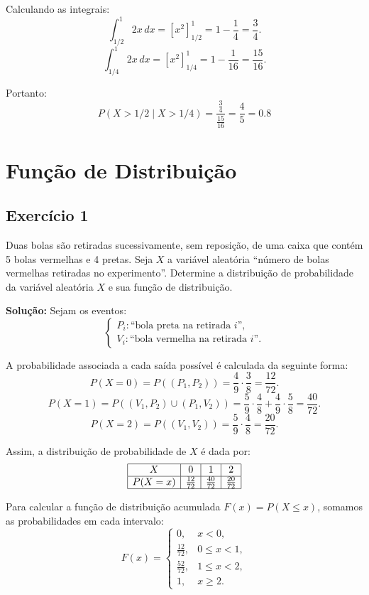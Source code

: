 \documentclass{article}
\begin{document}
Calculando as integrais:
    $$
    \int_{1/2}^{1} 2x \, dx = \left[ x^2 \right]_{1/2}^{1} = 1 - \frac{1}{4} = \frac{3}{4}.
    $$
    $$
    \int_{1/4}^{1} 2x \, dx = \left[ x^2 \right]_{1/4}^{1} = 1 - \frac{1}{16} = \frac{15}{16}.
    $$

Portanto:
    $$
    P(X > 1/2 \mid X > 1/4) = \frac{\tfrac{3}{4}}{\tfrac{15}{16}} = \frac{4}{5} = 0.8
    $$

\section{Função de Distribuição}
\subsection{Exercício 1}
Duas bolas são retiradas sucessivamente, sem reposição, de uma caixa que contém 5 bolas vermelhas e 4 pretas.  
Seja $X$ a variável aleatória ``número de bolas vermelhas retiradas no experimento''.  
Determine a distribuição de probabilidade da variável aleatória $X$ e sua função de distribuição.

\vspace{0.5cm}
\textbf{Solução:} Sejam os eventos:
    $$
    \begin{cases}
    P_i : \text{``bola preta na retirada $i$''}, \\
    V_i : \text{``bola vermelha na retirada $i$''}.
    \end{cases}
    $$
    
A probabilidade associada a cada saída possível é calculada da seguinte forma:
    $$
    P(X = 0) = P((P_1, P_2)) = \frac{4}{9} \cdot \frac{3}{8} = \frac{12}{72}.
    $$  
    $$
    P(X = 1) = P((V_1, P_2) \cup (P_1, V_2)) 
    = \frac{5}{9}\cdot \frac{4}{8} + \frac{4}{9}\cdot \frac{5}{8} 
    = \frac{40}{72}.
    $$
    $$
    P(X = 2) = P((V_1, V_2)) = \frac{5}{9} \cdot \frac{4}{8} = \frac{20}{72}.
    $$
    
Assim, a distribuição de probabilidade de $X$ é dada por:
    $$
    \begin{array}{|c|c|c|c|}
    \hline
    X & 0 & 1 & 2 \\
    \hline
    P(X=x) & \tfrac{12}{72} & \tfrac{40}{72} & \tfrac{20}{72} \\
    \hline
    \end{array}
    $$

\vspace{0.5cm}
Para calcular a função de distribuição acumulada $F(x) = P(X \leq x)$, somamos as probabilidades em cada intervalo:
    $$
    F(x) =
    \begin{cases}
    0, & x < 0, \\[6pt]
    \frac{12}{72}, & 0 \leq x < 1, \\[6pt]
    \frac{52}{72}, & 1 \leq x < 2, \\[6pt]
    1, & x \geq 2.
    \end{cases}
    $$
\end{document}
